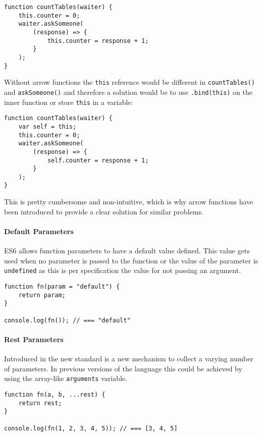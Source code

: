 \documentclass{bioinfo}
\begin{document}
\begin{lstlisting}
function countTables(waiter) {
    this.counter = 0;
    waiter.askSomeone(
        (response) => {
            this.counter = response + 1;
        }
    );
}
\end{lstlisting}

Without arrow functions the {\tt this} reference would be different in
{\tt countTables()} and {\tt askSomeone()} and therefore a
solution would be to use {\tt .bind(this)} on the inner function or store
{\tt this} in a variable:

\begin{lstlisting}
function countTables(waiter) {
    var self = this;
    this.counter = 0;
    waiter.askSomeone(
        (response) => {
            self.counter = response + 1;
        }
    );
}
\end{lstlisting}

This is pretty cumbersome and non-intuitive, which is why arrow functions
have been introduced to provide a clear solution for similar problems.

\paragraph{Default Parameters\textcolon}
ES6 allows function parameters to have a default value defined. This value gets used when
no parameter is passed to the function or the value of the parameter is {\tt undefined} as
this is per specification the value for not passing an argument.

\begin{lstlisting}
function fn(param = "default") {
    return param;
}

console.log(fn()); // === "default"
\end{lstlisting}

\paragraph{Rest Parameters\textcolon}
Introduced in the new standard is a new mechanism to collect a varying number of parameters.
In previous versions of the language this could be achieved by using the array-like
{\tt arguments} variable.

\begin{lstlisting}
function fn(a, b, ...rest) {
    return rest;
}

console.log(fn(1, 2, 3, 4, 5)); // === [3, 4, 5]
\end{lstlisting}
\end{document}
